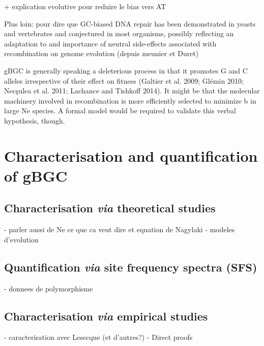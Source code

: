 + explication evolutive pour reduire le bias vers AT



Plus loin: \citep{marais2003biased} pour dire que  GC-biased DNA repair has been
demonstrated in yeasts and vertebrates and conjectured
in most organisms, possibly reflecting an adaptation to
and importance of neutral side-effects
associated with recombination on genome evolution
(depuis meunier et Duret)




gBGC is generally speaking a deleterious process in that it promotes G and C alleles irrespective of their effect on fitness (Galtier et al. 2009; Glémin 2010; Necşulea et al. 2011; Lachance and Tishkoff 2014). It might be that the molecular machinery involved in recombination is more efficiently selected to minimize b in large Ne species. A formal model would be required to validate this verbal hypothesis, though. 



\section{Characterisation and quantification of gBGC}
\subsection{Characterisation \textit{via} theoretical studies}
- parler aussi de Ne ce que ca veut dire et equation de Nagylaki
- modeles d'evolution
\subsection{Quantification \textit{via} site frequency spectra (SFS)}
- donnees de polymorphisme
\subsection{Characterisation \textit{via} empirical studies}
- caracterisation avec Lesecque (et d'autres?)
- Direct proofs


